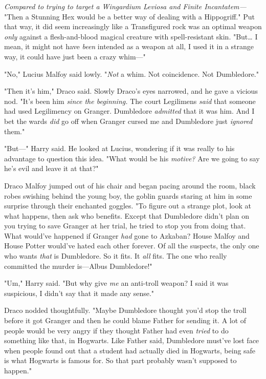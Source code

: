 \emph{Compared to trying to target a Wingardium Leviosa and Finite 
Incantatem---} "Then a Stunning Hex would be a better way of dealing with a 
Hippogriff." Put that way, it did seem increasingly like a Transfigured rock 
was an optimal weapon \emph{only} against a flesh-and-blood magical creature 
with spell-resistant skin. "But{\ldots} I mean, it might not have \emph{been} 
intended as a weapon at all, I used it in a strange way, it could have just 
been a crazy whim---"

"No," Lucius Malfoy said lowly. "\emph{Not} a whim. Not coincidence. Not 
Dumbledore."

"Then it's him," Draco said. Slowly Draco's eyes narrowed, and he gave a 
vicious nod. "It's been him \emph{since the beginning.} The court Legilimens 
\emph{said} that someone had used Legilimency on Granger. Dumbledore 
\emph{admitted} that it was him. And I bet the wards \emph{did} go off when 
Granger cursed me and Dumbledore just \emph{ignored} them."

"But---" Harry said. He looked at Lucius, wondering if it was really to his 
advantage to question this idea. "What would be his \emph{motive?} Are we going 
to say he's evil and leave it at that?"

Draco Malfoy jumped out of his chair and began pacing around the room, black 
robes swishing behind the young boy, the goblin guards staring at him in some 
surprise through their enchanted goggles. "To figure out a strange plot, look 
at what happens, then ask who benefits. Except that Dumbledore didn't plan on 
you trying to save Granger at her trial, he tried to stop you from doing that. 
What would've happened if Granger \emph{had} gone to Azkaban? House Malfoy and 
House Potter would've hated each other forever. Of all the suspects, the only 
one who wants \emph{that} is Dumbledore. So it fits. It \emph{all} fits. The 
one who really committed the murder is---Albus Dumbledore!"

"Um," Harry said. "But why give \emph{me} an anti-troll weapon? I said it was 
suspicious, I didn't say that it made any sense."

Draco nodded thoughtfully. "Maybe Dumbledore thought you'd stop the troll 
before it got Granger and then he could blame Father for sending it. A lot of 
people would be very angry if they thought Father had even \emph{tried} to do 
something like that, in Hogwarts. Like Father said, Dumbledore must've lost 
face when people found out that a student had actually died in Hogwarts, being 
safe is what Hogwarts is famous for. So that part probably wasn't supposed to 
happen."

